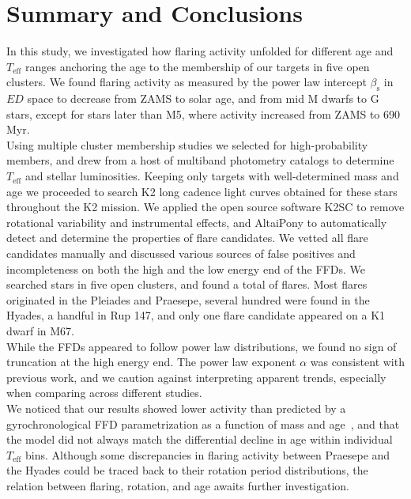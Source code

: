 \documentclass{aa}
\begin{document}
\section{Summary and Conclusions}
\label{sec:summary}
In this study, we investigated how flaring activity unfolded for different age and $T_\mathrm{eff}$ ranges anchoring the age to the membership of our targets in five open clusters. We found flaring activity as measured by the power law intercept $\beta_\mathrm{s}$ in $ED$ space to decrease from ZAMS to solar age, and from mid M dwarfs to G stars, except for stars later than M5, where activity increased from ZAMS to 690\,Myr.
\\
Using multiple cluster membership studies we selected for high-probability members, and drew from a host of multiband photometry catalogs to determine $T_\mathrm{eff}$ and stellar luminosities. Keeping only targets with well-determined mass and age we proceeded to search K2 long cadence light curves obtained for these stars throughout the K2 mission. We applied the open source software K2SC to remove rotational variability and instrumental effects, and AltaiPony to automatically detect and determine the properties of flare candidates. We vetted all flare candidates manually and discussed various sources of false positives and incompleteness on both the high and the low energy end of the FFDs. We searched stars in five open clusters, and found a total of flares. Most flares originated in the Pleiades and Praesepe, several hundred were found in the Hyades, a handful in Rup 147, and only one flare candidate appeared on a K1 dwarf in M67.
\\
While the FFDs appeared to follow power law distributions, we found no sign of truncation at the high energy end. The power law exponent $\alpha$ was consistent with previous work, and we caution against interpreting apparent trends, especially when comparing across different studies.
\\
We noticed that our results showed lower activity than predicted by a gyrochronological FFD parametrization as a function of mass and age~\citep{davenport2019}, and that the model did not always match the differential decline in age within individual $T_\mathrm{eff}$ bins. Although some discrepancies in flaring activity between Praesepe and the Hyades could be traced back to their rotation period distributions, the relation between flaring, rotation, and age awaits further investigation.
\end{document}
